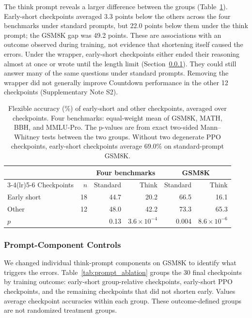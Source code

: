 \documentclass[ai,article,submit,oneauthor]{Definitions/mdpi}
\begin{document}
The think prompt reveals a larger difference between the groups (Table~\ref{tab:think_gap}). Early-short checkpoints averaged 3.3 points below the others across the four benchmarks under standard prompts, but 22.0 points below them under the think prompt; the GSM8K gap was 49.2 points. These are associations with an outcome observed during training, not evidence that shortening itself caused the errors. Under the wrapper, early-short checkpoints either ended their reasoning almost at once or wrote until the length limit (Section~\ref{sec:prompt_ablation}). They could still answer many of the same questions under standard prompts. Removing the wrapper did not generally improve Countdown performance in the other 12 checkpoints (Supplementary Note S2).

\begin{table}[H]
\centering
\caption{Flexible accuracy (\%) of early-short and other checkpoints, averaged over checkpoints. Four benchmarks: equal-weight mean of GSM8K, MATH, BBH, and MMLU-Pro. The p-values are from exact two-sided Mann--Whitney tests between the two groups. Without two degenerate PPO checkpoints, early-short checkpoints average 69.0\% on standard-prompt GSM8K.}
\label{tab:think_gap}
\begin{tabular}{lrrrrr}
\toprule
 & & \multicolumn{2}{c}{Four benchmarks} & \multicolumn{2}{c}{GSM8K} \\
\cmidrule(lr){3-4}\cmidrule(lr){5-6}
Checkpoints & $n$ & Standard & Think & Standard & Think \\
\midrule
Early short & 18 & 44.7 & 20.2 & 66.5 & 16.1 \\
Other & 12 & 48.0 & 42.2 & 73.3 & 65.3 \\
$p$ & & 0.13 & $3.6\times10^{-4}$ & 0.004 & $8.6\times10^{-6}$ \\
\bottomrule
\end{tabular}
\end{table}

\subsubsection{Prompt-Component Controls}\label{sec:prompt_ablation}

We changed individual think-prompt components on GSM8K to identify what triggers the errors. Table~\ref{tab:prompt_ablation} groups the 30 final checkpoints by training outcome: early-short group-relative checkpoints, early-short PPO checkpoints, and the remaining checkpoints that did not shorten early. Values average checkpoint accuracies within each group. These outcome-defined groups are not randomized treatment groups.
\end{document}
